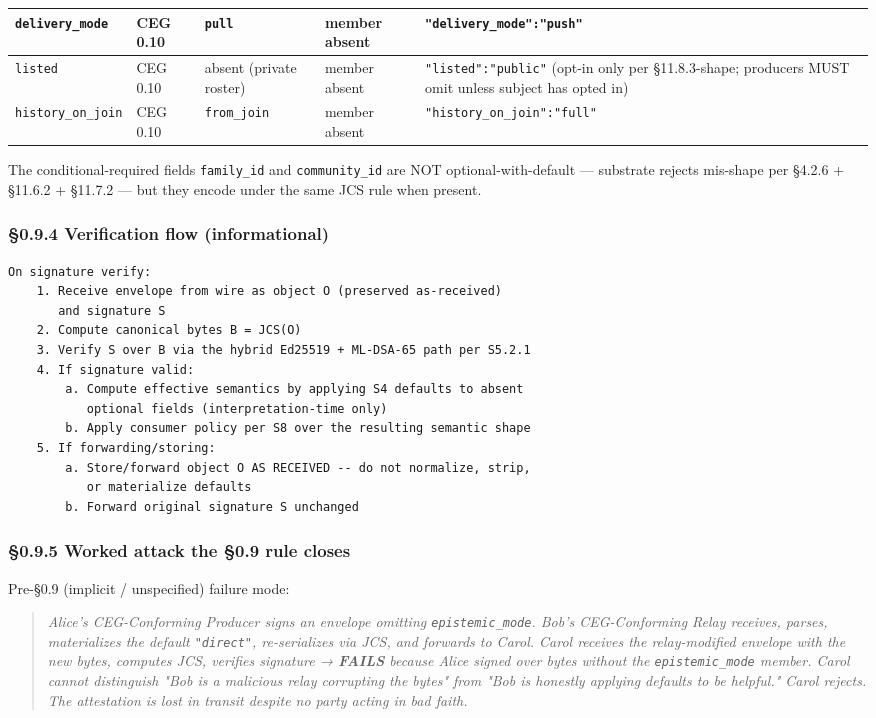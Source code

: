 \documentclass[10pt]{article}
\begin{document}
{\begin{longtable}{|p{3.2cm}|p{3.2cm}|p{3.2cm}|p{3.2cm}|p{3.2cm}|}
\texttt{delivery\_mode} & CEG 0.10 & \texttt{pull} & member absent & \texttt{"delivery\_mode":"push"} \\ \hline
\texttt{listed} & CEG 0.10 & absent (private roster) & member absent & \texttt{"listed":"public"} (opt-in only per §11.8.3-shape; producers MUST omit unless subject has opted in) \\ \hline
\texttt{history\_on\_join} & CEG 0.10 & \texttt{from\_join} & member absent & \texttt{"history\_on\_join":"full"} \\ \hline
\end{longtable}}


The conditional-required fields \texttt{family\_id} and \texttt{community\_id} are NOT optional-with-default — substrate rejects mis-shape per §4.2.6 + §11.6.2 + §11.7.2 — but they encode under the same JCS rule when present.


\subsubsection*{§0.9.4 Verification flow (informational)}


\begin{lstlisting}
On signature verify:
    1. Receive envelope from wire as object O (preserved as-received)
       and signature S
    2. Compute canonical bytes B = JCS(O)
    3. Verify S over B via the hybrid Ed25519 + ML-DSA-65 path per S5.2.1
    4. If signature valid:
        a. Compute effective semantics by applying S4 defaults to absent
           optional fields (interpretation-time only)
        b. Apply consumer policy per S8 over the resulting semantic shape
    5. If forwarding/storing:
        a. Store/forward object O AS RECEIVED -- do not normalize, strip,
           or materialize defaults
        b. Forward original signature S unchanged
\end{lstlisting}

\subsubsection*{§0.9.5 Worked attack the §0.9 rule closes}


Pre-§0.9 (implicit / unspecified) failure mode:


\begin{quote}\itshape Alice's CEG-Conforming Producer signs an envelope omitting \texttt{epistemic\_mode}. Bob's CEG-Conforming Relay receives, parses, materializes the default \texttt{"direct"}, re-serializes via JCS, and forwards to Carol. Carol receives the relay-modified envelope with the new bytes, computes JCS, verifies signature → \textbf{FAILS} because Alice signed over bytes without the \texttt{epistemic\_mode} member. Carol cannot distinguish "Bob is a malicious relay corrupting the bytes" from "Bob is honestly applying defaults to be helpful." Carol rejects. The attestation is lost in transit despite no party acting in bad faith.\end{quote}
\end{document}

